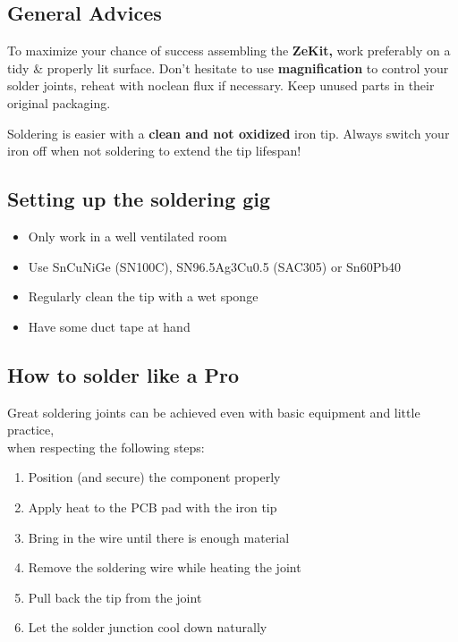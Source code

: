 \documentclass{scrartcl}
\begin{document}
\subsection{General Advices}

To maximize your chance of success assembling the \textbf{ZeKit,} work preferably on a tidy \& properly lit surface.
Don't hesitate to use \textbf{magnification} to control your solder joints, reheat with noclean flux if necessary.
Keep unused parts in their original packaging.

Soldering is easier with a \textbf{clean and not oxidized} iron tip. Always switch your iron off when not soldering to extend the tip lifespan!

\subsection{Setting up the soldering gig}

\begin{itemize}
    \item Only work in a well ventilated room
    \item Use SnCuNiGe (SN100C), SN96.5Ag3Cu0.5 (SAC305) or Sn60Pb40
    \item Regularly clean the tip with a wet sponge
    \item Have some duct tape at hand
\end{itemize}

\subsection{How to solder like a Pro}

Great soldering joints can be achieved even with basic equipment and little practice,\\
when respecting the following steps:

\begin{enumerate}
    \item Position (and secure) the component properly
    \item Apply heat to the PCB pad with the iron tip
    \item Bring in the wire until there is enough material
    \item Remove the soldering wire while heating the joint
    \item Pull back the tip from the joint
    \item Let the solder junction cool down naturally
\end{enumerate}
\end{document}
